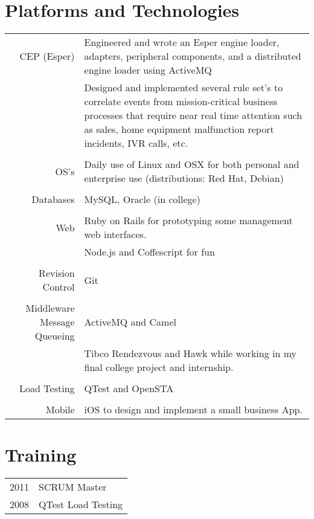 \documentclass[a4paper,10pt]{article}
\begin{document}
\section{Platforms and Technologies}
\begin{tabular}{r|p{11cm}}
	CEP (Esper) 
	& Engineered and wrote an Esper engine loader, adapters, peripheral components, and a distributed engine loader using ActiveMQ\\
	& Designed and implemented several rule set's to correlate events from mission-critical business processes that require near real time attention such as sales, home equipment malfunction report incidents, IVR calls, etc.\\
\multicolumn{2}{c}{} \\ 
	OS's 
	&  Daily use of Linux and OSX for both personal and enterprise use (distributions: Red Hat, Debian) \\
\multicolumn{2}{c}{} \\
	Databases 
	& MySQL, Oracle (in college)\\
\multicolumn{2}{c}{} \\
	Web 
	& Ruby on Rails for prototyping some management web interfaces. \\
	& Node.js and Coffescript for fun \\
\multicolumn{2}{c}{} \\
	Revision Control 
	& Git \\
\multicolumn{2}{c}{} \\
	Middleware \ Message Queueing
	& ActiveMQ and Camel \\
	& Tibco Rendezvous and Hawk while working in my final college project and internship. \\
\multicolumn{2}{c}{} \\
	Load Testing 
	& QTest and OpenSTA \\
\multicolumn{2}{c}{} \\
	Mobile 
	& iOS to design and implement a small business App. \\
\end{tabular}

\section{Training}
\begin{tabular}{rl}
 2011 & SCRUM Master  \\
 2008 & QTest Load Testing \\
\end{tabular}
\end{document}
